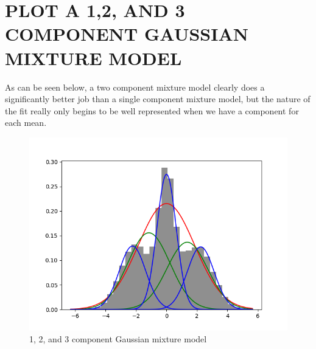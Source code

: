 \documentclass{article}
\begin{document}
\section{\MakeUppercase{Plot a 1,2, and 3 component Gaussian mixture model}}
As can be seen below, a two component mixture model clearly does a significantly better job than a single component mixture model, but the nature of the fit really only begins to be well represented when we have a component for each mean.
\begin{figure}[!htb]
	\centering
	\begin{minipage}{0.49\textwidth}
			\centering
			\includegraphics[width=1\linewidth]{../q1to6pics/q2.png}
			\caption{1, 2, and 3 component Gaussian mixture model}
	\end{minipage}\hfill
\end{figure}
\pagebreak
\end{document}
